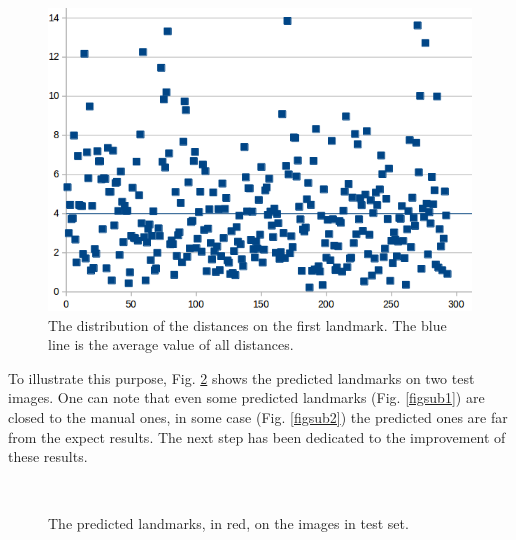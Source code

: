\begin{figure}[htbp]
	\centerline{\includegraphics[scale=0.5]{images/statistic_pronotum_from_scratch_lm1}}
	\caption{The distribution of the distances on the first landmark. The blue line is the average value of all distances.}
	\label{figchartlm1}
\end{figure}

To illustrate this purpose, Fig. \ref{figrsexample} shows the predicted landmarks on two test images. One can note that even some predicted landmarks (Fig. \ref{figsub1}) are closed to the manual ones, in some case (Fig. \ref{figsub2}) the predicted ones are far from the expect results. The next step has been dedicated to the improvement of these results.

\begin{figure}[htbp]
    \centering
    ~~
\\    
    \caption{The predicted landmarks, in red,  on the images in test set.}
    \label{figrsexample}
\end{figure}


